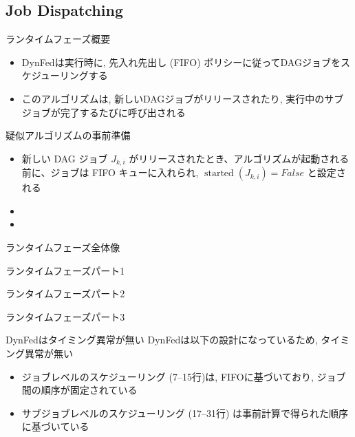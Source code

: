 \subsection{Job Dispatching}
\label{ssec: Job Dispatching}

\begin{frame}{ランタイムフェーズ概要}
    \begin{itemize}
        \item DynFedは実行時に, 先入れ先出し (FIFO) ポリシーに従ってDAGジョブをスケジューリングする
        \item このアルゴリズムは, 新しいDAGジョブがリリースされたり, 実行中のサブジョブが完了するたびに呼び出される
    \end{itemize}
\end{frame}

\begin{frame}{疑似アルゴリズムの事前準備}
    \begin{itemize}
        \item 新しい DAG ジョブ $J_{k, i}$ がリリースされたとき、アルゴリズムが起動される前に、ジョブは FIFO キューに入れられ, $\operatorname{started}\left(J_{k, i}\right)= False$ と設定される
        \item {}
        \item {}
    \end{itemize}
\end{frame}

\begin{frame}{ランタイムフェーズ全体像}
\end{frame}

\begin{frame}{ランタイムフェーズパート1}
\end{frame}

\begin{frame}{ランタイムフェーズパート2}
\end{frame}

\begin{frame}{ランタイムフェーズパート3}
\end{frame}

\begin{frame}{DynFedはタイミング異常が無い}
    DynFedは以下の設計になっているため, タイミング異常が無い
    \begin{itemize}
        \item ジョブレベルのスケジューリング (7--15行)は, FIFOに基づいており, ジョブ間の順序が固定されている
        \item サブジョブレベルのスケジューリング (17--31行) は事前計算で得られた順序に基づいている
    \end{itemize}
\end{frame}
